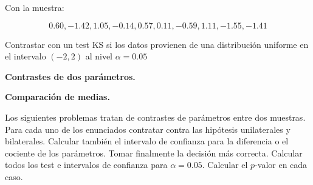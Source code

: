\documentclass[12pt]{article}
\begin{document}
\begin{prob} Con la muestra:

$$0.60, -1.42,  1.05, -0.14,  0.57,  0.11, -0.59, 1.11, -1.55, -1.41
$$

Contrastar con un test KS si los datos provienen de una distribución uniforme en el intervalo $(-2,2)$ al nivel $\alpha=0.05$
\end{prob}




%
%
%
%
%
%
%
%

\newpage

\textbf{Contrastes de dos parámetros.}

\textbf{Comparación de medias.}

Los siguientes problemas tratan de contrastes de parámetros entre dos muestras. Para cada uno de los enunciados contratar contra las  hipótesis unilaterales y bilaterales. Calcular también el intervalo de confianza para la diferencia o el cociente de los parámetros. Tomar finalmente la decisión más correcta. Calcular todos los test e intervalos de confianza para $\alpha=0.05$. Calcular el $p$-valor en cada caso. 
\end{document}
